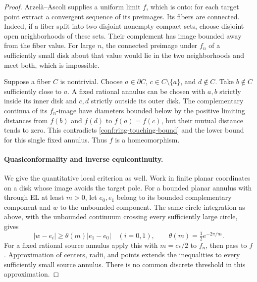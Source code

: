 \documentclass[11pt]{article}
\numberwithin{equation}{section}
\theoremstyle{definition}
\theoremstyle{remark}
\newcommand{\1}{\mathbf 1}
\begin{document}
\begin{proof}
Arzel\`a--Ascoli supplies a uniform limit \(f\), which is onto:
for each target point extract a convergent sequence of its
preimages.  Its fibers are connected.  Indeed, if a fiber split
into two disjoint nonempty compact sets, choose disjoint open
neighborhoods of these sets.  Their complement has image bounded
away from the fiber value.  For large \(n\), the connected
preimage under \(f_n\) of a sufficiently small disk about that
value would lie in the two neighborhoods and meet both, which is
impossible.

Suppose a fiber \(C\) is nontrivial.  Choose \(a\in\partial C\),
\(c\in C\setminus\{a\}\), and \(d\notin C\).  Take
\(b\notin C\) sufficiently close to \(a\).  A fixed rational
annulus can be chosen with \(a,b\) strictly inside its inner disk
and \(c,d\) strictly outside its outer disk.  The complementary
continua of its \(f_n\)-image have diameters bounded below by the
positive limiting distances from \(f(b)\) and \(f(d)\) to
\(f(a)=f(c)\), but their mutual distance tends to zero.  This
contradicts \eqref{conf:ring-touching-bound} and the lower bound
for this single fixed annulus.  Thus \(f\) is a homeomorphism.

\paragraph{Quasiconformality and inverse equicontinuity.}
We give the quantitative local criterion as well.  Work in finite
planar coordinates on a disk whose image avoids the target pole.
For a bounded planar annulus with through EL at least \(m>0\),
let \(e_0,e_1\) belong to its bounded complementary component and
\(w\) to the unbounded component.  The same circle integration
as above, with the unbounded continuum crossing every sufficiently
large circle, gives
\begin{equation}
 |w-e_i|\ge \theta(m)|e_1-e_0|\quad(i=0,1),
 \qquad \theta(m)=\tfrac12 e^{-2\pi/m}.
 \label{conf:relative-ring}
\end{equation}
For a fixed rational source annulus apply this with \(m=c_*/2\)
to \(f_n\), then pass to \(f\).  Approximation of centers,
radii, and points extends the inequalities to every sufficiently
small source annulus.  There is no common discrete threshold in
this approximation.


\end{proof}
\end{document}
